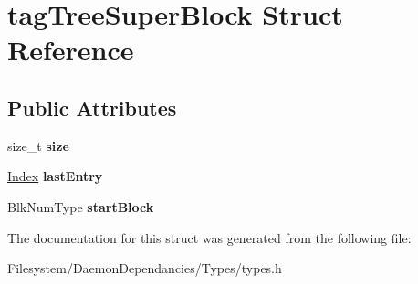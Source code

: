 \hypertarget{structtagTreeSuperBlock}{}\section{tag\+Tree\+Super\+Block Struct Reference}
\label{structtagTreeSuperBlock}
\subsection*{Public Attributes}
\begin{DoxyCompactItemize}
\item 
size\+\_\+t {\bfseries size}\hypertarget{structtagTreeSuperBlock_a5fba4a1328640e6b41f4c3e8ca7ee804}{}\label{structtagTreeSuperBlock_a5fba4a1328640e6b41f4c3e8ca7ee804}

\item 
\hyperlink{structindex}{Index} {\bfseries last\+Entry}\hypertarget{structtagTreeSuperBlock_ac2492d025873ac0d95921ee91acabe51}{}\label{structtagTreeSuperBlock_ac2492d025873ac0d95921ee91acabe51}

\item 
Blk\+Num\+Type {\bfseries start\+Block}\hypertarget{structtagTreeSuperBlock_ad7f50abf9a6efeee63037e73d0c349d9}{}\label{structtagTreeSuperBlock_ad7f50abf9a6efeee63037e73d0c349d9}

\end{DoxyCompactItemize}


The documentation for this struct was generated from the following file\+:\begin{DoxyCompactItemize}
\item 
Filesystem/\+Daemon\+Dependancies/\+Types/types.\+h\end{DoxyCompactItemize}
